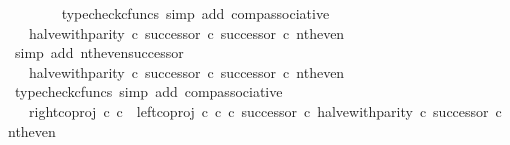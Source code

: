 \begin{isabellebody}
\ \ \ \ \ \ \isamarkupfalse%
\ {\isacharparenleft}{\kern0pt}typecheck{\isacharunderscore}{\kern0pt}cfuncs{\isacharcomma}{\kern0pt}\ simp\ add{\isacharcolon}{\kern0pt}\ comp{\isacharunderscore}{\kern0pt}associative{}{\isacharparenright}{\kern0pt}\isanewline
\ \ \ \ \isamarkupfalse%
\ \isamarkupfalse%
\ {\isachardoublequoteopen}{\isachardot}{\kern0pt}{\isachardot}{\kern0pt}{\isachardot}{\kern0pt}\ {\isacharequal}{\kern0pt}\ halve{\isacharunderscore}{\kern0pt}with{\isacharunderscore}{\kern0pt}parity\ {\isasymcirc}\isactrlsub c\ {\isacharparenleft}{\kern0pt}successor\ {\isasymcirc}\isactrlsub c\ successor{\isacharparenright}{\kern0pt}\ {\isasymcirc}\isactrlsub c\ nth{\isacharunderscore}{\kern0pt}even{\isachardoublequoteclose}\isanewline
\ \ \ \ \ \ \isamarkupfalse%
\ {\isacharparenleft}{\kern0pt}simp\ add{\isacharcolon}{\kern0pt}\ nth{\isacharunderscore}{\kern0pt}even{\isacharunderscore}{\kern0pt}successor{\isacharparenright}{\kern0pt}\isanewline
\ \ \ \ \isamarkupfalse%
\ \isamarkupfalse%
\ {\isachardoublequoteopen}{\isachardot}{\kern0pt}{\isachardot}{\kern0pt}{\isachardot}{\kern0pt}\ {\isacharequal}{\kern0pt}\ {\isacharparenleft}{\kern0pt}{\isacharparenleft}{\kern0pt}halve{\isacharunderscore}{\kern0pt}with{\isacharunderscore}{\kern0pt}parity\ {\isasymcirc}\isactrlsub c\ successor{\isacharparenright}{\kern0pt}\ {\isasymcirc}\isactrlsub c\ successor{\isacharparenright}{\kern0pt}\ {\isasymcirc}\isactrlsub c\ nth{\isacharunderscore}{\kern0pt}even{\isachardoublequoteclose}\isanewline
\ \ \ \ \ \ \isamarkupfalse%
\ {\isacharparenleft}{\kern0pt}typecheck{\isacharunderscore}{\kern0pt}cfuncs{\isacharcomma}{\kern0pt}\ simp\ add{\isacharcolon}{\kern0pt}\ comp{\isacharunderscore}{\kern0pt}associative{}{\isacharparenright}{\kern0pt}\isanewline
\ \ \ \ \isamarkupfalse%
\ \isamarkupfalse%
\ {\isachardoublequoteopen}{\isachardot}{\kern0pt}{\isachardot}{\kern0pt}{\isachardot}{\kern0pt}\ {\isacharequal}{\kern0pt}\ {\isacharparenleft}{\kern0pt}{\isacharparenleft}{\kern0pt}{\isacharparenleft}{\kern0pt}right{\isacharunderscore}{\kern0pt}coproj\ {\isasymnat}\isactrlsub c\ {\isasymnat}\isactrlsub c\ {\isasymamalg}\ {\isacharparenleft}{\kern0pt}left{\isacharunderscore}{\kern0pt}coproj\ {\isasymnat}\isactrlsub c\ {\isasymnat}\isactrlsub c\ {\isasymcirc}\isactrlsub c\ successor{\isacharparenright}{\kern0pt}{\isacharparenright}{\kern0pt}\ {\isasymcirc}\isactrlsub c\ halve{\isacharunderscore}{\kern0pt}with{\isacharunderscore}{\kern0pt}parity{\isacharparenright}{\kern0pt}\ {\isasymcirc}\isactrlsub c\ successor{\isacharparenright}{\kern0pt}\ {\isasymcirc}\isactrlsub c\ nth{\isacharunderscore}{\kern0pt}even{\isachardoublequoteclose}\isanewline

\end{isabellebody}
